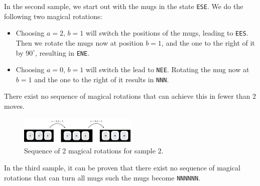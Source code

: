 \noindent
In the second sample, we start out with the mugs in the state \texttt{ESE}. We do the following two magical rotations:
\begin{itemize}
  \item Choosing $a = 2$, $b = 1$ will switch the positions of the mugs, leading to \texttt{EES}. Then we rotate the mugs now at position $b = 1$, and the one to the right of it by $90^\circ$, resulting in \texttt{ENE}.
  \item Choosing $a = 0$, $b = 1$ will switch the lead to \texttt{NEE}. Rotating the mug now at $b = 1$ and the one to the right of it results in \texttt{NNN}.
\end{itemize}
There exist no sequence of magical rotations that can achieve this in fewer than 2 moves.
\begin{figure}[h!]
  \centering
  \includegraphics[width=0.5\textwidth]{sample2.png}
  \caption{Sequence of 2 magical rotations for sample 2.}
\end{figure}


\noindent
In the third sample, it can be proven that there exist no sequence of magical rotations that can turn all mugs such the mugs become \texttt{NNNNNN}. 